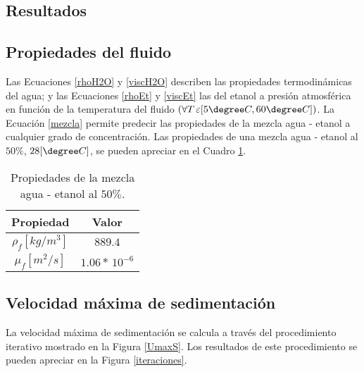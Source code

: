 \begin{center}
	\section{Resultados} \label{teorico:sed}
\end{center}


\subsection{Propiedades del fluido}

\noindent
\justify

Las Ecuaciones \ref{rhoH2O} y \ref{viscH2O} describen las propiedades termodin\'amicas del agua; y las Ecuaciones \ref{rhoEt} y \ref{viscEt} las del etanol a presi\'on atmosf\'erica en funci\'on de la temperatura del fluido $\left(\forall T \, \varepsilon [5 \degree C, 60 \degree C] \right)$. La Ecuaci\'on \ref{mezcla} permite predecir las propiedades de la mezcla agua - etanol a cualquier grado de concentraci\'on. Las propiedades de una mezcla agua - etanol al $50 \%$, $28 [\degree C]$, se pueden apreciar en el Cuadro \ref{temoM}.

\begin{table}[h!]
	\centering
	\begin{tabular}{|c|c|}
	\hline
	\textbf{Propiedad} & \textbf{Valor} \\ \hline
	$\rho _f \left[ kg / m^3 \right]$ & $889.4$ \\ \hline
	$\mu _f \left[ m^2 / s \right] $ & $1.06 * \, 10^{-6}$ \\ \hline
	\end{tabular}
	\caption{Propiedades de la mezcla agua - etanol al $50 \%$.}
	\label{temoM}
\end{table}

\subsection{Velocidad m\'axima de sedimentaci\'on}

\noindent
\justify

La velocidad m\'axima de sedimentaci\'on se calcula a trav\'es del procedimiento iterativo mostrado en la Figura \ref{UmaxS}. Los resultados de este procedimiento se pueden apreciar en la Figura \ref{iteraciones}.

